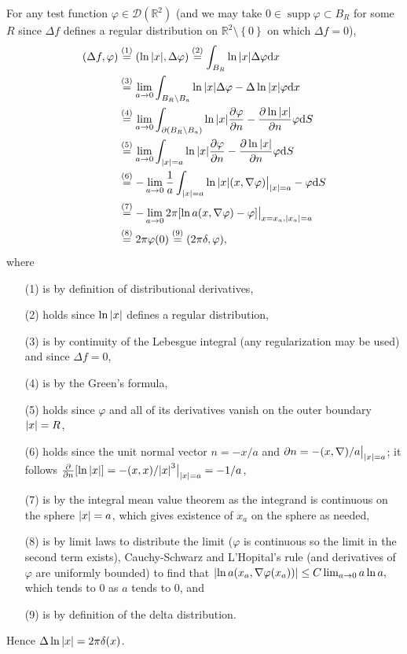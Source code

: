 \documentclass[11pt]{article}
\newcommand{\cbr}[1]{\left\{#1\right\}}
\newcommand{\eq}[1]{\overset{(#1)}{=}}
\DeclareMathOperator{\supp}{supp}
\begin{document}
\begin{enumerate}
\begin{enumerate}
        For any test function $\varphi\in\mathcal{D}(\mathbb{R}^2)$ (and we may take $0\in \supp\varphi\subset B_R$ for some $R$ since $\Delta f$ defines a regular distribution on $\mathbb{R}^2\setminus\cbr{0}$ on which $\Delta f =0$), \begin{align*}
            (\Delta f,\varphi) &\eq{1} (\ln\abs{x},\Delta\varphi) \eq{2} \int_{B_R} \ln\abs{x}\Delta\varphi \dd x\\
            &\eq{3}\lim_{a\to 0}\int_{B_R\setminus B_a}\ln\abs{x}\Delta\varphi - \Delta\ln\abs{x}\varphi\dd x\\
            &\eq{4}\lim_{a\to 0}\int_{\partial(B_R\setminus B_a)}\ln\abs{x}\pdv{\varphi}{n}-\pdv{\ln\abs{x}}{n}\varphi \dd S\\
            &\eq{5} \lim_{a\to 0}\int_{\abs{x} =a}\ln\abs{x}\pdv{\varphi}{n}-\pdv{\ln\abs{x}}{n}\varphi \dd S\\
            &\eq{6} -\lim_{a\to 0}\frac{1}{a}\int_{\abs{x} = a}\ln\abs{x}(x,\nabla \varphi)\big|_{\abs{x} = a} - \varphi \dd S\\
            &\eq{7}-\lim_{a\to 0}2\pi [\ln a(x,\nabla\varphi)-\varphi]\big|_{x = x_a,\abs{x_a}=a} \\
            &\eq{8}2\pi\varphi(0) \eq{9} (2\pi\delta,\varphi),
        \end{align*} where \begin{enumerate}
            \item[(1)] is by definition of distributional derivatives,
            \item[(2)] holds since $\ln\abs{x}$ defines a regular distribution,
            \item[(3)] is by continuity of the Lebesgue integral (any regularization may be used) and since $\Delta f = 0$,
            \item[(4)] is by the Green's formula,
            \item[(5)] holds since $\varphi$ and all of its derivatives vanish on the outer boundary $\abs{x} = R$,
            \item[(6)] holds since the unit normal vector $n = -x/a$ and $\partial n = -(x,\nabla)/a\big|_{\abs{x} = a}$; it follows $\pdv n [\ln\abs{x}] = -(x,x)/\abs{x}^3\big|_{\abs{x} = a} = -1/a$,
            \item[(7)] is by the integral mean value theorem as the integrand is continuous on the sphere $\abs{x} = a$, which gives existence of $x_a$ on the sphere as needed,
            \item[(8)] is by limit laws to distribute the limit ($\varphi$ is continuous so the limit in the second term exists), Cauchy-Schwarz and L'Hopital's rule (and derivatives of $\varphi$ are uniformly bounded) to find that $\abs{\ln a(x_a,\nabla\varphi(x_a))} \leq C\lim_{a\to 0}a\ln a,$ which tends to $0$ as $a$ tends to $0$, and
            \item[(9)] is by definition of the delta distribution. 
        \end{enumerate} Hence $\Delta \ln\abs{x} = 2\pi\delta(x)$.
    \end{enumerate}


\end{enumerate}
\end{document}
